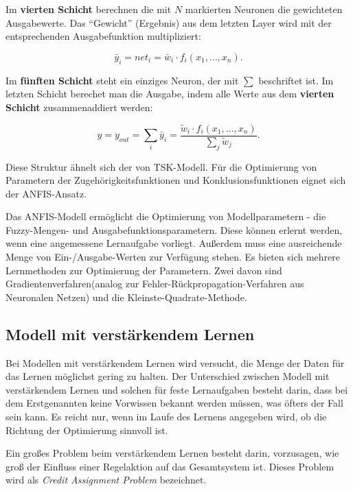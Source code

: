 Im \textbf{vierten Schicht} berechnen die mit $N$ markierten Neuronen die gewichteten Ausgabewerte. Das ``Gewicht'' (Ergebnis) aus dem letzten Layer wird mit der entsprechenden Ausgabefunktion multipliziert:

\begin{equation}
\bar{y}_i = net_i = \bar{w}_i\cdot f_i(x_1, ..., x_n). 
\end{equation}

Im \textbf{fünften Schicht} steht ein einziges Neuron, der mit $\sum$ beschriftet ist. Im letzten Schicht berechet man die Ausgabe, indem alle Werte aus dem \textbf{vierten Schicht} zusammenaddiert werden:

\begin{equation}
y = y_{out} = \sum_i \bar{y}_i = \frac{\tilde{w}_i\cdot f_i(x_1, ..., x_n)}{\sum_j \tilde{w}_j}.
\end{equation}

Diese Struktur ähnelt sich der von TSK-Modell. Für die Optimierung von Parametern der Zugehörigkeitsfunktionen und Konklusionsfunktionen eignet sich der ANFIS-Ansatz.

Das ANFIS-Modell ermöglicht die Optimierung von Modellparametern - die Fuzzy-Mengen- und Ausgabefunktionsparametern. Diese können erlernt werden, wenn eine angemessene Lernaufgabe vorliegt. Außerdem muss eine ausreichende Menge von Ein-/Ausgabe-Werten zur Verfügung stehen. Es bieten sich mehrere Lernmethoden zur Optimierung der Parametern. Zwei davon sind Gradientenverfahren(analog zur Fehler-Rückpropagation-Verfahren aus Neuronalen Netzen) und die Kleinste-Quadrate-Methode. \cite{CIKruse:15} \cite{Jang:93}

\subsection{Modell mit verstärkendem Lernen}

Bei Modellen mit verstärkendem Lernen wird versucht, die Menge der Daten für das Lernen möglichst gering zu halten. Der Unterschied zwischen Modell mit verstärkendem Lernen und solchen für feste Lernaufgaben besteht darin, dass bei dem Erstgenannten keine Vorwissen bekannt werden müssen, was öfters der Fall sein kann. Es reicht nur, wenn im Laufe des Lernens angegeben wird, ob die Richtung der Optimierung sinnvoll ist.

Ein großes Problem beim verstärkendem Lernen besteht darin, vorzusagen, wie groß der Einfluss einer Regelaktion auf das Gesamtsystem ist. Dieses Problem wird als \textit{Credit Assignment Problem} bezeichnet.

